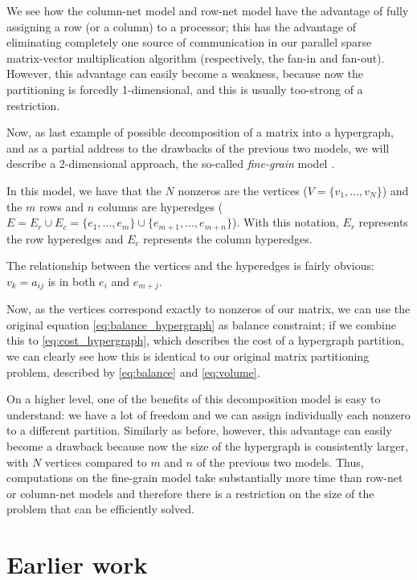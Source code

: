 We see how the column-net model and row-net model have the advantage of fully assigning a row (or a column) to a processor; this has the advantage of eliminating completely one source of communication in our parallel sparse matrix-vector multiplication algorithm (respectively, the fan-in and fan-out). However, this advantage can easily become a weakness, because now the partitioning is forcedly 1-dimensional, and this is usually too-strong of a restriction.

Now, as last example of possible decomposition of a matrix into a hypergraph, and as a partial address to the drawbacks of the previous two models, we will describe a 2-dimensional approach, the so-called \emph{fine-grain} model \cite{hypergraph_finegrain}.

In this model, we have that the $N$ nonzeros are the vertices ($V = \{ v_1,\dots,v_N\}$) and the $m$ rows and $n$ columns are hyperedges ($E = E_r \cup E_c = \{ e_1,\dots,e_m \} \cup \{e_{m+1},\dots,e_{m+n}\}$). With this notation, $E_r$ represents the row hyperedges and $E_c$ represents the column hyperedges.

The relationship between the vertices and the hyperedges is fairly obvious: $v_k = a_{ij}$ is in both $e_i$ and $e_{m+j}$.

Now, as the vertices correspond exactly to nonzeros of our matrix, we can use the original equation \eqref{eq:balance_hypergraph} as balance constraint; if we combine this to \eqref{eq:cost_hypergraph}, which describes the cost of a hypergraph partition, we can clearly see how this is identical to our original matrix partitioning problem, described by \eqref{eq:balance} and \eqref{eq:volume}.

On a higher level, one of the benefits of this decomposition model is easy to understand: we have a lot of freedom and we can assign individually each nonzero to a different partition. Similarly as before, however, this advantage can easily become a drawback because now the size of the hypergraph is consistently larger, with $N$ vertices compared to $m$ and $n$ of the previous two models. Thus, computations on the fine-grain model take substantially more time than row-net or column-net models and therefore there is a restriction on the size of the problem that can be efficiently solved.

\section{Earlier work}


